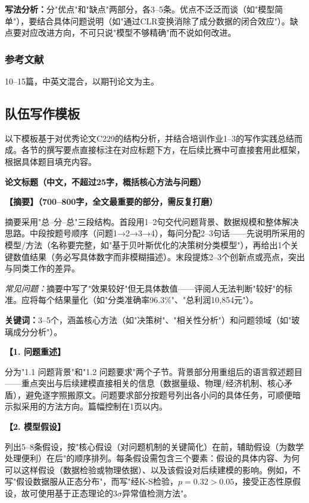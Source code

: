 \documentclass[12pt,a4paper]{ctexart}
\begin{document}
\textbf{写法分析：}分"优点"和"缺点"两部分，各3--5条。优点不泛泛而谈（如"模型简单"），要结合具体问题说明（如"通过CLR变换消除了成分数据的闭合效应"）。缺点要对应改进方向，不可只说"模型不够精确"而不说如何改进。

\subsubsection{参考文献}

10--15篇，中英文混合，以期刊论文为主。

\subsection{队伍写作模板}

以下模板基于对优秀论文C229的结构分析，并结合培训作业1--3的写作实践总结而成。各节的撰写要点直接标注在对应标题下方，在后续比赛中可直接套用此框架，根据具体题目填充内容。

\newpage
\noindent\textbf{\large 论文标题（中文，不超过25字，概括核心方法与问题）}

\bigskip
\noindent\textbf{【摘要】（700--800字，全文最重要的部分，需反复打磨）}

摘要采用"总--分--总"三段结构。首段用1--2句交代问题背景、数据规模和整体解决思路。中段按题号顺序（问题1→2→3→4），每问分配2--3句话——先说明所采用的模型/方法（名称要完整，如"基于贝叶斯优化的决策树分类模型"），再给出1个关键数值结果（务必写具体数字而非模糊描述）。末段提炼2--3个创新点或亮点，突出与同类工作的差异。

\textit{常见问题：}摘要中写了"效果较好"但无具体数值——评阅人无法判断"较好"的标准。应将每个结果量化（如"分类准确率96.3\%"、"总利润10,854元"）。

\noindent\textbf{关键词：}3--5个，涵盖核心方法（如"决策树"、"相关性分析"）和问题领域（如"玻璃成分分析"）。

\medskip
\noindent\textbf{【1. 问题重述】}

分为"1.1 问题背景"和"1.2 问题要求"两个子节。背景部分用重组后的语言叙述题目——重点突出与后续建模直接相关的信息（数据量级、物理/经济机制、核心矛盾），避免逐字照搬原文。问题要求部分按题号列出各小问的具体任务，可顺便暗示拟采用的方法方向。篇幅控制在1页以内。

\medskip
\noindent\textbf{【2. 模型假设】}

列出5--8条假设，按"核心假设（对问题机制的关键简化）在前，辅助假设（为数学处理便利）在后"的顺序排列。每条假设需包含三个要素：假设的具体内容、为何可以这样假设（数据检验或物理依据）、以及该假设对后续建模的影响。例如，不写"假设数据服从正态分布"，而写"经K-S检验，$p=0.32>0.05$，接受正态性原假设，故可使用基于正态理论的3$\sigma$异常值检测方法"。
\end{document}
